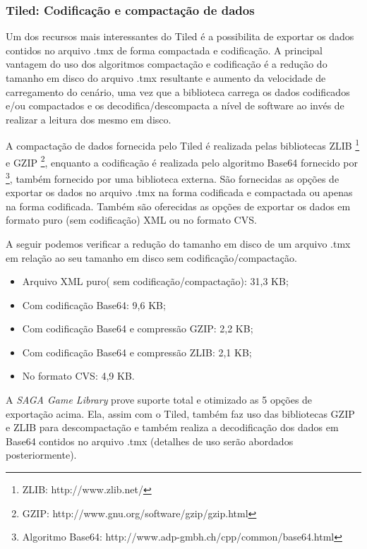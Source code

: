 \subsubsection{Tiled: Codificação e compactação de dados}
%
%
Um dos recursos mais interessantes do Tiled é a possibilita de exportar os dados contidos no arquivo .tmx de forma compactada e codificação. 
A principal vantagem do uso dos algoritmos compactação e codificação é a redução do tamanho em disco do arquivo .tmx resultante e aumento da velocidade de carregamento do cenário, uma vez que a biblioteca carrega os dados codificados e/ou compactados e os decodifica/descompacta a nível de software ao invés de realizar a leitura dos mesmo em disco. 
\par 
A compactação de dados fornecida pelo Tiled é realizada pelas bibliotecas ZLIB \footnote{ZLIB: http://www.zlib.net/} e GZIP \footnote{GZIP: http://www.gnu.org/software/gzip/gzip.html}, enquanto a codificação é realizada pelo algoritmo Base64 fornecido por \footnote{Algoritmo Base64: http://www.adp-gmbh.ch/cpp/common/base64.html}, também fornecido por uma biblioteca externa.
São fornecidas as opções de exportar os dados no arquivo .tmx na forma codificada e compactada ou apenas na forma codificada. Também são oferecidas as opções de exportar os dados em formato puro (sem codificação) XML ou no formato CVS. 
\par 
A seguir podemos verificar a redução do tamanho em disco de um arquivo .tmx em relação ao seu tamanho em disco sem codificação/compactação.
%
\begin{itemize}
 \item Arquivo XML puro( sem codificação/compactação): 31,3 KB;
 \item Com codificação Base64: 9,6 KB;
 \item Com codificação Base64 e compressão GZIP: 2,2 KB;
 \item Com codificação Base64 e compressão ZLIB: 2,1 KB;
 \item No formato CVS: 4,9 KB.
\end{itemize}
%
A \textit{SAGA Game Library} prove suporte total e otimizado as 5 opções de exportação acima. Ela, assim com o Tiled, também faz
uso das bibliotecas GZIP e ZLIB para descompactação e também realiza a decodificação dos dados em Base64 contidos no arquivo .tmx (detalhes de uso serão abordados posteriormente).
%
%
%
%
